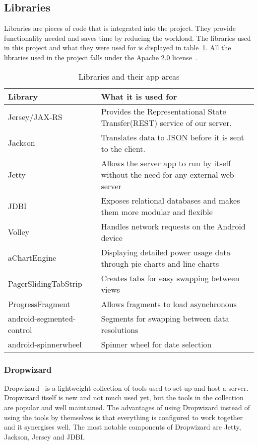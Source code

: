 \subsection{Libraries}
\label{sec:libraries}
Libraries are pieces of code that is integrated into the project. They provide functionality needed and saves time by reducing the workload. The libraries used in this project and what they were used for is displayed in table~\ref{tab:libs}.
 All the libraries used in the project falls under the Apache 2.0 license~\cite{apache}.

\begin{table}[H]
\begin{tabular}{|l|p{10.4cm}|}
\hline
\textbf{Library }& \textbf{What it is used for}\\\hline
Jersey/JAX-RS~\cite{jersey} & Provides the Representational State Transfer(REST) service of our server.\\\hline
Jackson~\cite{jackson}&Translates data to \gls{JSON} before it is sent to the client.\\\hline
Jetty~\cite{jetty}&Allows the server app to run by itself without the need for any external web server\\\hline
JDBI~\cite{jdbi}&Exposes relational databases and makes them more modular and flexible\\\hline
Volley~\cite{volley}& Handles network requests on the Android device\\\hline
aChartEngine~\cite{achart}& Displaying detailed power usage data through  pie charts and line charts\\\hline
PagerSlidingTabStrip~\cite{psts}& Creates tabs for easy swapping between views\\\hline
ProgressFragment~\cite{progressfragment}& Allows fragments to load asynchronous\\\hline
android-segmented-control~\cite{segments}& Segments for swapping between data resolutions\\\hline
android-spinnerwheel\cite{spinnerwheel}& Spinner wheel for date selection\\\hline
\end{tabular}
\caption{Libraries and their app areas}
\label{tab:libs}
\end{table}


\subsubsection{Dropwizard}
Dropwizard~\cite{dropwizard} is a lightweight collection of tools used to set up and host a server. Dropwizard itself is new and not much used yet, but the tools in the collection are popular and well maintained. 
The advantages of using Dropwizard instead of using the tools by themselves is that everything is configured to work together and it synergises well. The most notable components of Dropwizard are Jetty, Jackson, Jersey and JDBI.


